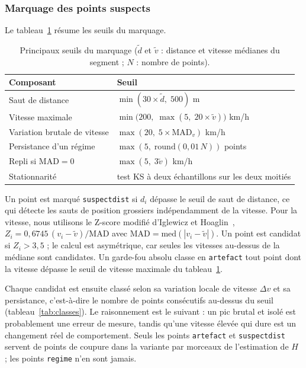 \documentclass[11pt,a4paper]{article}
\newcommand{\code}[1]{\texttt{#1}}
\renewcommand{\_}{\textunderscore\penalty0\hspace{0pt}}
\begin{document}
\subsubsection{Marquage des points suspects}

Le tableau~\ref{tab:seuils} résume les seuils du marquage.

\begin{table}[ht]
\centering
\caption{Principaux seuils du marquage ($\tilde d$ et $\tilde v$ : distance et vitesse
médianes du segment ; $N$ : nombre de points).}
\label{tab:seuils}
\small
\begin{tabular}{p{4.6cm}p{8.4cm}}
\toprule
Composant & Seuil \\
\midrule
Saut de distance & $\min(30\times\tilde d,\;500)$ m \\
Vitesse maximale & $\min\bigl(200,\;\max(5,\;20\times\tilde v)\bigr)$ km/h \\
Variation brutale de vitesse & $\max(20,\;5\times\mathrm{MAD}_v)$ km/h \\
Persistance d'un régime & $\max(5,\;\mathrm{round}(0{,}01\,N))$ points \\
Repli si $\mathrm{MAD}=0$ & $\max(5,\;3\tilde v)$ km/h \\
Stationnarité & test KS à deux échantillons sur les deux moitiés \\
\bottomrule
\end{tabular}
\end{table}

Un point est marqué \code{suspect\_dist} si $d_i$ dépasse le seuil de saut de distance, ce
qui détecte les sauts de position grossiers indépendamment de la vitesse. Pour la vitesse,
nous utilisons le Z-score modifié d'Iglewicz et Hoaglin~\cite{iglewicz1993},
$Z_i = 0{,}6745\,(v_i-\tilde v)/\mathrm{MAD}$ avec $\mathrm{MAD}=\mathrm{med}(|v_i-\tilde v|)$.
Un point est candidat si $Z_i>3{,}5$ ; le calcul est asymétrique, car seules les vitesses
au-dessus de la médiane sont candidates. Un garde-fou absolu classe en \code{artefact} tout
point dont la vitesse dépasse le seuil de vitesse maximale du tableau~\ref{tab:seuils}.

Chaque candidat est ensuite classé selon sa variation locale de vitesse $\Delta v$ et sa
persistance, c'est-à-dire le nombre de points consécutifs au-dessus du seuil
(tableau~\ref{tab:classes}). Le raisonnement est le suivant : un pic brutal et isolé est
probablement une erreur de mesure, tandis qu'une vitesse élevée qui dure est un changement
réel de comportement. Seuls les points \code{artefact} et \code{suspect\_dist} servent de
points de coupure dans la variante par morceaux de l'estimation de $H$ ; les points
\code{regime} n'en sont jamais.
\end{document}

